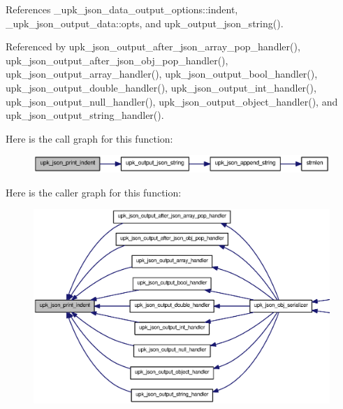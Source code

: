 References \_\-upk\_\-json\_\-data\_\-output\_\-options::indent, \_\-upk\_\-json\_\-output\_\-data::opts, and upk\_\-output\_\-json\_\-string().



Referenced by upk\_\-json\_\-output\_\-after\_\-json\_\-array\_\-pop\_\-handler(), upk\_\-json\_\-output\_\-after\_\-json\_\-obj\_\-pop\_\-handler(), upk\_\-json\_\-output\_\-array\_\-handler(), upk\_\-json\_\-output\_\-bool\_\-handler(), upk\_\-json\_\-output\_\-double\_\-handler(), upk\_\-json\_\-output\_\-int\_\-handler(), upk\_\-json\_\-output\_\-null\_\-handler(), upk\_\-json\_\-output\_\-object\_\-handler(), and upk\_\-json\_\-output\_\-string\_\-handler().



Here is the call graph for this function:\nopagebreak
\begin{figure}[H]
\begin{center}
\leavevmode
\includegraphics[width=400pt]{upk__json_8c_a35c1571829c8b52d6810f25193f6f1f0_cgraph}
\end{center}
\end{figure}




Here is the caller graph for this function:\nopagebreak
\begin{figure}[H]
\begin{center}
\leavevmode
\includegraphics[width=400pt]{upk__json_8c_a35c1571829c8b52d6810f25193f6f1f0_icgraph}
\end{center}
\end{figure}



